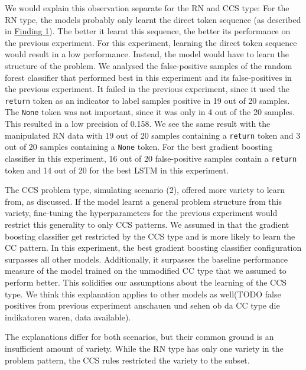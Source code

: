 We would explain this observation separate for the RN and CCS type:
For the RN type, the models probably only learnt the direct token sequence (as described in \hyperref[finding:return_none_manipulated_bad]{Finding 1}). The better it learnt this sequence, the better its performance on the previous experiment. For this experiment, learning the direct token sequence would result in a low performance. Instead, the model would have to learn the structure of the problem. 
We analysed the false-positive samples of the random forest classifier that performed best in this experiment and its false-positives in the previous experiment. It failed in the previous experiment, since it used the \texttt{return} token as an indicator to label samples positive in 19 out of 20 samples. The \texttt{None} token was not important, since it was only in 4 out of the 20 samples. This resulted in a low precision of 0.158. We see the same result with the manipulated RN data with 19 out of 20 samples containing a \texttt{return} token and 3 out of 20 samples containing a \texttt{None} token. For the best gradient boosting classifier in this experiment, 16 out of 20 false-positive samples contain a \texttt{return} token and 14 out of 20 for the best LSTM in this experiment.


The CCS problem type, simulating scenario (2), offered more variety to learn from, as discussed. If the model learnt a general problem structure from this variety, fine-tuning the hyperparameters for the previous experiment would restrict this generality to only CCS patterns. We assumed in  that the gradient boosting classifier get restricted by the CCS type and is more likely to learn the CC pattern. In this experiment, the best gradient boosting classifier configuration surpasses all other models. Additionally, it surpasses the baseline performance measure of the model trained on the unmodified CC type that we assumed to perform better. This solidifies our assumptions about the learning of the CCS type. We think this explanation applies to other models as well(TODO false positives from previous experiment anschauen und sehen ob da CC type die indikatoren waren, data available).

The explanations differ for both scenarios, but their common ground is an insufficient amount of variety. While the RN type has only one variety in the problem pattern, the CCS rules restricted the variety to the subset.

